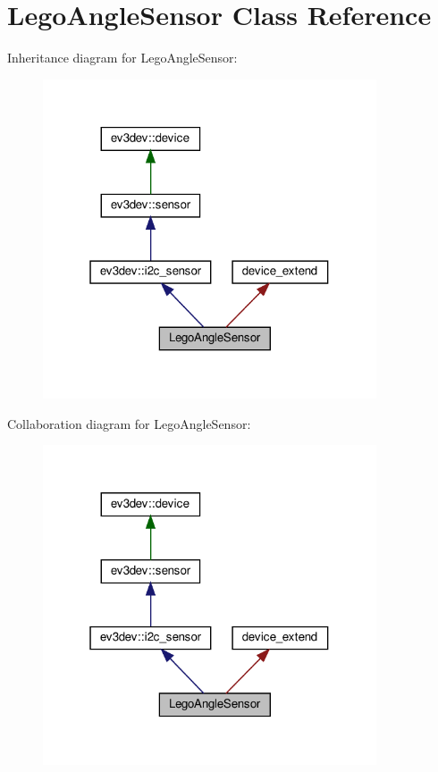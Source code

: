 \hypertarget{classLegoAngleSensor}{}\section{Lego\+Angle\+Sensor Class Reference}
\label{classLegoAngleSensor}


Inheritance diagram for Lego\+Angle\+Sensor\+:
\nopagebreak
\begin{figure}[H]
\begin{center}
\leavevmode
\includegraphics[width=280pt]{classLegoAngleSensor__inherit__graph}
\end{center}
\end{figure}


Collaboration diagram for Lego\+Angle\+Sensor\+:
\nopagebreak
\begin{figure}[H]
\begin{center}
\leavevmode
\includegraphics[width=280pt]{classLegoAngleSensor__coll__graph}
\end{center}
\end{figure}
